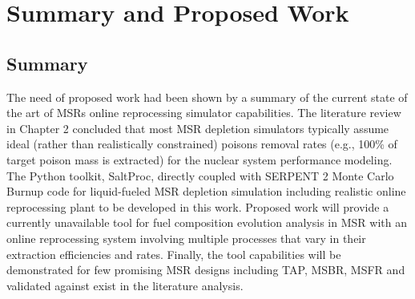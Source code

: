 \chapter[Summary and Proposed Work]{Summary and Proposed Work}

\section{Summary}
The need of proposed work had been shown by a summary of the 
current state of the art of \glspl{MSR} online reprocessing 
simulator capabilities. The literature review in Chapter 2 
concluded that most \gls{MSR} depletion simulators typically 
assume ideal (rather than realistically constrained) poisons 
removal rates (e.g., 100\% of target poison mass is extracted) 
for the nuclear system performance modeling. The Python 
toolkit, SaltProc, directly coupled with SERPENT 2 Monte Carlo Burnup 
code for liquid-fueled \gls{MSR} depletion simulation 
including realistic online reprocessing plant to be developed 
in this work. Proposed work will provide a currently unavailable 
tool for fuel composition evolution analysis in \gls{MSR} with 
an online reprocessing system involving multiple processes 
that vary in their extraction efficiencies and rates. Finally, 
the tool capabilities will be demonstrated for few promising 
\gls{MSR} designs including \gls{TAP}, 
\gls{MSBR}, \gls{MSFR} and validated against exist in the 
literature analysis.

 
